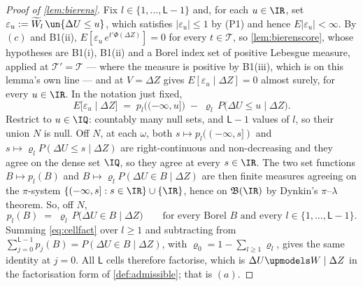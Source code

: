 \begin{proof}[Proof of \cref{lem:bierens}]
Fix $l\in\{1,\dots,\mathsf L-1\}$ and, for each $u\in\IR$, set
$\varepsilon_u:=\widetilde W_l\,\un\{\Delta U\le u\}$, which satisfies $|\varepsilon_u|\le1$ by (P1) and
hence $E|\varepsilon_u|<\infty$. By $(c)$ and B1(ii), $E[\varepsilon_u\,e^{t'\Phi(\Delta Z)}]=0$ for every
$t\in\mathcal T$, so \cref{lem:bierenscore}, whose hypotheses are B1(i), B1(ii) and a Borel index set of
positive Lebesgue measure, applied at $\mathcal T'=\mathcal T$ --- where the measure is positive by
B1(iii), which is on this lemma's own line --- and at
$V=\Delta Z$ gives $E[\varepsilon_u\mid\Delta Z]=0$ almost surely, for every $u\in\IR$. In the notation
just fixed,
\[
E\big[\varepsilon_u\mid\Delta Z\big]
\;=\;p_l\big((-\infty,u]\big)\;-\;\varrho_l\,P\big(\Delta U\le u\mid\Delta Z\big).
\]
Restrict to $u\in\IQ$: countably many null sets, and $\mathsf L-1$ values of $l$, so their union $N$ is
null.
Off $N$, at each $\omega$, both $s\mapsto p_l((-\infty,s])$ and
$s\mapsto\varrho_lP(\Delta U\le s\mid\Delta Z)$ are right-continuous and non-decreasing and they agree
on the dense set $\IQ$, so they agree at every $s\in\IR$. The two set functions $B\mapsto p_l(B)$ and
$B\mapsto\varrho_lP(\Delta U\in B\mid\Delta Z)$ are then finite measures agreeing on the $\pi$-system
$\{(-\infty,s]:s\in\IR\}\cup\{\IR\}$, hence on $\mathfrak B(\IR)$ by Dynkin's $\pi$--$\lambda$ theorem.
So, off $N$,
\begin{equation}\label{eq:cellfact}
p_l(B)\;=\;\varrho_l\,P\big(\Delta U\in B\mid\Delta Z\big)
\qquad\text{for every Borel }B\text{ and every }l\in\{1,\dots,\mathsf L-1\}.
\end{equation}
Summing \eqref{eq:cellfact} over $l\ge1$ and subtracting from
$\sum_{j=0}^{\mathsf L-1}p_j(B)=P(\Delta U\in B\mid\Delta Z)$, with
$\varrho_0=1-\sum_{l\ge1}\varrho_l$, gives the same identity at $j=0$. All $\mathsf L$ cells therefore
factorise, which is $\Delta U\upmodels W\mid\Delta Z$ in the factorisation form of
\cref{def:admissible}; that is $(a)$.


\end{proof}
